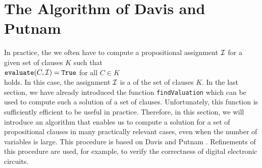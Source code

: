 
\section{The Algorithm of Davis and Putnam}
In practice, the we often have to compute a propositional assignment $\mathcal{I}$ for a given set of clauses $K$ such that
\\[0.2cm]
\hspace*{1.3cm} $\texttt{evaluate}(C,\mathcal{I}) = \texttt{True}$ \quad for all $C \in K$ \\[0.2cm]
holds. In this case,  the assignment $\mathcal{I}$ is a  of the set of clauses $K$. In
the last section, we have already introduced the function \texttt{findValuation} which can be used to compute
such a solution of a set of clauses.  Unfortunately, this function is sufficiently efficient to be useful in
practice.
Therefore, in this section, we will introduce an algorithm that enables us to compute a solution for a
set of propositional clauses in many practically relevant cases, even when the number of variables is
large. This procedure is based on Davis and Putnam \cite{davis:1960, davis:1962}. Refinements of this procedure
\cite{moskewicz:2001} are used, for example, to verify the correctness of digital electronic circuits. 

